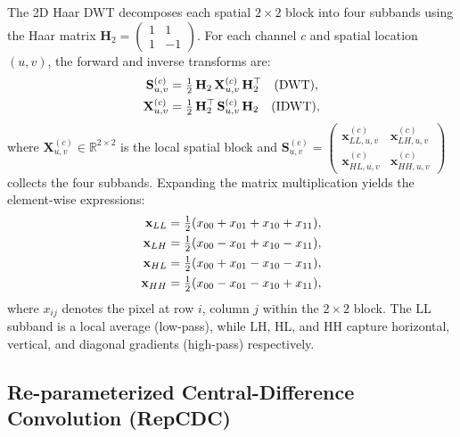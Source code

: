 \documentclass{article}
\theoremstyle{plain}
\theoremstyle{definition}
\theoremstyle{remark}
\begin{document}
The 2D Haar DWT decomposes each spatial $2{\times}2$ block into four subbands using the Haar matrix $\mathbf{H}_2 = \begin{pmatrix} 1 & 1\\ 1 & -1 \end{pmatrix}$. For each channel $c$ and spatial location $(u,v)$, the forward and inverse transforms are:
\vspace{-0.2cm}
\begin{equation}
\label{eq:haar_dwt_idwt_appendix}
\begin{aligned}
\mathbf{S}^{(c)}_{u,v} &= \tfrac{1}{2}\,\mathbf{H}_2\,\mathbf{X}^{(c)}_{u,v}\,\mathbf{H}_2^{\top} \quad \text{(DWT)},\\
\mathbf{X}^{(c)}_{u,v} &= \tfrac{1}{2}\,\mathbf{H}_2^{\top}\,\mathbf{S}^{(c)}_{u,v}\,\mathbf{H}_2 \quad \text{(IDWT)},
\end{aligned}
\vspace{-0.2cm}
\end{equation}
where $\mathbf{X}^{(c)}_{u,v} \in \mathbb{R}^{2\times 2}$ is the local spatial block and $\mathbf{S}^{(c)}_{u,v} = \begin{pmatrix}\mathbf{x}^{(c)}_{LL,u,v} & \mathbf{x}^{(c)}_{LH,u,v}\\ \mathbf{x}^{(c)}_{HL,u,v} & \mathbf{x}^{(c)}_{HH,u,v}\end{pmatrix}$ collects the four subbands. Expanding the matrix multiplication yields the element-wise expressions:
\vspace{-0.2cm}
\begin{equation}
\begin{aligned}
\mathbf{x}_{LL} &= \tfrac{1}{2}(x_{00} + x_{01} + x_{10} + x_{11}), \\
\mathbf{x}_{LH} &= \tfrac{1}{2}(x_{00} - x_{01} + x_{10} - x_{11}), \\
\mathbf{x}_{HL} &= \tfrac{1}{2}(x_{00} + x_{01} - x_{10} - x_{11}), \\
\mathbf{x}_{HH} &= \tfrac{1}{2}(x_{00} - x_{01} - x_{10} + x_{11}),
\end{aligned}
\vspace{-0.2cm}
\end{equation}
where $x_{ij}$ denotes the pixel at row $i$, column $j$ within the $2{\times}2$ block. The LL subband is a local average (low-pass), while LH, HL, and HH capture horizontal, vertical, and diagonal gradients (high-pass) respectively.

\subsection{Re-parameterized Central-Difference Convolution (RepCDC)}
\end{document}
